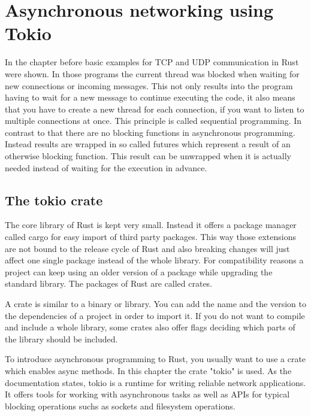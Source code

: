 
\section{Asynchronous networking using Tokio}
In the chapter before basic examples for TCP and UDP communication in Rust were shown. In those programs the current
thread was blocked when waiting for new connections or incoming messages. This not only results into the program having
to wait for a new message to continue executing the code, it also means that you have to create a new thread for each
connection, if you want to listen to multiple connections at once. This principle is called sequential programming. In
contrast to that there are no blocking functions in asynchronous programming. Instead results are wrapped in so called
futures which represent a result of an otherwise blocking function. This result can be unwrapped when it is actually
needed instead of waiting for the execution in advance. \cite{c18network}

\subsection{The tokio crate}
The core library of Rust is kept very small. Instead it offers a package manager called cargo for easy import of third
party packages. This way those extensions are not bound to the release cycle of Rust and also breaking changes will just
affect one single package instead of the whole library. For compatibility reasons a project can keep using an older
version of a package while upgrading the standard library. The packages of Rust are called crates.

A crate is similar to a binary or library. You can add the name and the version to the dependencies of a project in
order to import it. If you do not want to compile and include a whole library, some crates also offer flags deciding
which parts of the library should be included.

To introduce asynchronous programming to Rust, you usually want to use a crate which enables async methods. In this
chapter the crate "tokio" is used. As the documentation \cite{tokio-doc} states, tokio is a runtime for writing
reliable network applications. It offers tools for working with asynchronous tasks as well as APIs for typical blocking
operations suchs as sockets and filesystem operations.

